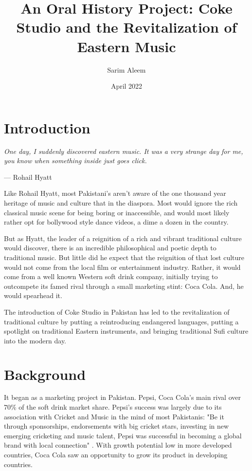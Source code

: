 \documentclass{article}
\title{An Oral History Project: Coke Studio and the Revitalization of Eastern Music}
\date{April 2022}
\author{Sarim Aleem}
\begin{document}
  \maketitle

  
  \section{Introduction}

  \epigraph{\itshape One day, I suddenly discovered eastern music. It was a very
  strange day for me, you know when something inside just goes click.}{--- Rohail Hyatt}

  
  Like Rohail Hyatt, most Pakistani's aren't aware of the one thousand year
  heritage of music and culture that in the diaspora. Most would ignore the rich
  classical music scene for being boring or inaccessible, and would most likely
  rather opt for bollywood style dance videos, a dime a dozen in the country. 

  But as Hyatt, the leader of a reignition of a rich and vibrant traditional
  culture would discover, there is an incredible philosophical and poetic depth
  to traditional music.  But little did he expect that the reignition of that
  lost culture would not come from the local film or entertainment industry.
  Rather, it would come from a well known Western soft drink company, initially
  trying to outcompete its famed rival through a small marketing stint: Coca
  Cola. And, he would spearhead it. 

  The introduction of Coke Studio in Pakistan has led to the revitalization of
  traditional culture by putting a reintroducing endangered languages, putting a
  spotlight on traditional Eastern instruments, and bringing traditional Sufi
  culture into the modern day. 

  \section{Background}

  It began as a marketing project in Pakistan. Pepsi, Coca Cola's main rival
  over 70\% of the soft drink market share. Pepsi's success was largely due to
  its association with Cricket and Music in the mind of most Pakistanis: "Be it
  through sponsorships, endorsements with big cricket stars, investing in new
  emerging cricketing and music talent, Pepsi was successful in becoming a
  global brand with local connection" \autocite{Chibmedium}. With growth 
  potential low in more developed countries, Coca Cola saw an opportunity to 
  grow its product in developing countries. 
\end{document}
